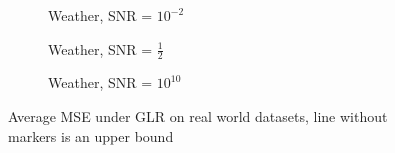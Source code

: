 \begin{figure}
\begin{subfigure}{0.3\columnwidth}
    \caption{Weather, SNR = $10^{-2}$}
    \label{weather_GLR_MSE_subfiga}
    \end{subfigure}\hfill
    \begin{subfigure}{0.3\columnwidth}
    \caption{Weather, SNR = $\frac{1}{2}$}%
    \label{weather_GLR_MSE_subfigb}%
    \end{subfigure}\hfill%
    \begin{subfigure}{0.3\columnwidth}
    \caption{Weather, SNR = $10^{10}$}%
    \label{weather_GLR_MSE_subfigc}%
    \end{subfigure}%
    \caption{Average MSE under GLR on real world datasets, line without markers is an upper bound}
\label{GLR_real_MSE_fig}
\end{figure}
\fi

